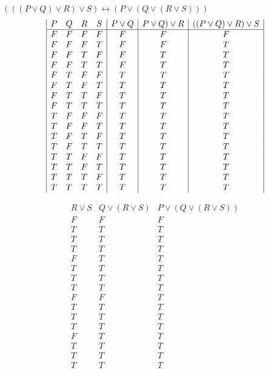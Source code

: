 \documentclass[a4paper,12pt]{article}
\begin{document}
$(((P \vee Q) \vee R) \vee S) \leftrightarrow (P \vee (Q \vee (R \vee S)))$\\
\begin{displaymath}
\begin {array} {|c c c c|c|c|c|}
P & Q & R & S &
P \vee Q &
P \vee Q) \vee R &
((P \vee Q) \vee R )\vee S \\
\hline
F & F & F & F & F & F & F\\
F & F & F & T & F & F & T\\
F & F & T & F & F & T & T\\
F & F & T & T & F & T & T\\
F & T & F & F & T & T & T\\
F & T & F & T & T & T & T\\
F & T & T & F & T & T & T\\
F & T & T & T & T & T & T\\
T & F & F & F & T & T & T\\
T & F & F & T & T & T & T\\
T & F & T & F & T & T & T\\
T & F & T & T & T & T & T\\
T & T & F & F & T & T & T\\
T & T & F & T & T & T & T\\
T & T & T & F & T & T & T\\
T & T & T & T & T & T & T\\
\end{array}
\end{displaymath}

\begin{displaymath}
\begin {array} {|c|c|c|}
R \vee S &
Q \vee (R \vee S) &
P \vee (Q \vee (R \vee S))\\
\hline

F & F & F\\
T & T & T\\
T & T & T\\
T & T & T\\
F & T & T\\
T & T & T\\
T & T & T\\
T & T & T\\
F & F & T\\
T & T & T\\
T & T & T\\
T & T & T\\
F & T & T\\
T & T & T\\
T & T & T\\
T & T & T\\
\end{array}
\end{displaymath}
\end{document}
